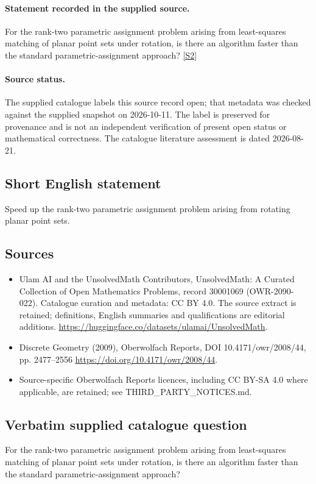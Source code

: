 \documentclass[11pt]{article}
\begin{document}
\paragraph{Statement recorded in the supplied source.}
For the rank-two parametric assignment problem arising from least-squares matching of planar point sets under rotation, is there an algorithm faster than the standard parametric-assignment approach? \href{https://doi.org/10.4171/owr/2008/44}{[S2]}
\paragraph{Source status.}
The supplied catalogue labels this source record open; that metadata was checked against the supplied snapshot on 2026-10-11. The label is preserved for provenance and is not an independent verification of present open status or mathematical correctness. The catalogue literature assessment is dated 2026-08-21.
\subsection{Short English statement}
Speed up the rank-two parametric assignment problem arising from rotating planar point sets.
\subsection{Sources}
\begin{itemize}
\item[S1] Ulam AI and the UnsolvedMath Contributors, UnsolvedMath: A Curated Collection of Open Mathematics Problems, record 30001069 (OWR-2090-022). Catalogue curation and metadata: CC BY 4.0. The source extract is retained; definitions, English summaries and qualifications are editorial additions.
\url{https://huggingface.co/datasets/ulamai/UnsolvedMath}.
\item[S2] Discrete Geometry (2009), Oberwolfach Reports, DOI 10.4171/owr/2008/44, pp. 2477--2556
\url{https://doi.org/10.4171/owr/2008/44}.
\item Source-specific Oberwolfach Reports licences, including CC BY-SA 4.0 where applicable, are retained; see THIRD\_PARTY\_NOTICES.md.
\end{itemize}
\subsection{Verbatim supplied catalogue question}
For the rank-two parametric assignment problem arising from least-squares matching of planar point sets under rotation, is there an algorithm faster than the standard parametric-assignment approach?
\end{document}
